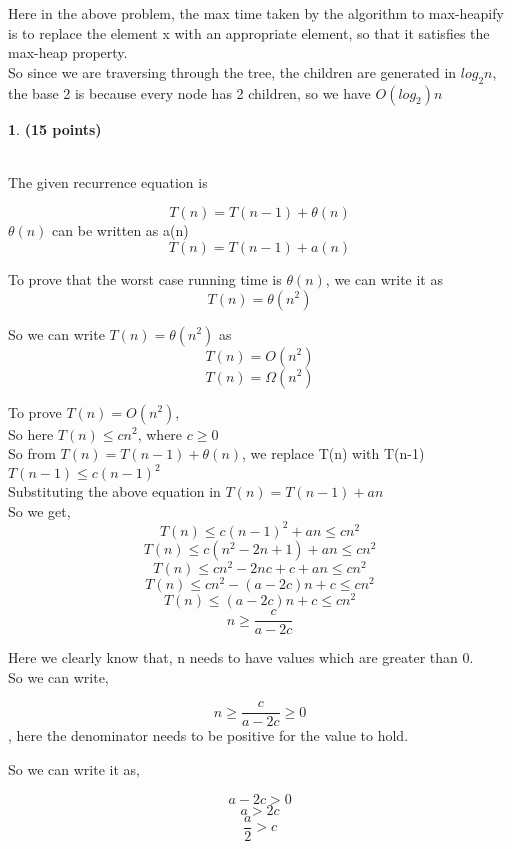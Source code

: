 \documentclass[11pt]{article}
\theoremstyle{definition}
\newtheorem{prob}{}
\newcommand{\solution}{\medskip\noindent{\color{DarkBlue}\textbf{Solution:}}}
\begin{document}
Here in the above problem, the max time taken by the algorithm to max-heapify is to replace the element x with an appropriate element, so that it satisfies the max-heap property. \\

So since we are traversing through the tree, the children are generated in $log_2 n$, the base 2 is because every node has 2 children, so we have $O(log_2) n$

\begin{prob} \textbf{(15 points)}
\end{prob}
\solution \\
The given recurrence equation is

\[ T(n) = T(n-1) + \theta(n)\]
$\theta(n)$ can be written as a(n)
\[ T(n) = T(n-1) + a(n)\]

To prove that the worst case running time is $\theta(n)$, we can write it as
\[ T(n) = \theta(n^2) \]

So we can write $T(n) = \theta(n^2)$ as
\[ T(n) = O(n^2) \]
\[ T(n) = \Omega(n^2) \]

To prove $T(n) = O(n^2)$, \\

So here $ T(n) \leq cn^2$, where $c \geq 0$ \\

So from $T(n) = T(n-1) + \theta(n)$, we replace T(n) with T(n-1) \\

$T(n-1) \leq c(n-1)^2$ \\

Substituting the above equation in $T(n) = T(n-1) + an$ \\

So we get, \\

\[ T(n) \leq c(n-1)^2 + an \leq cn^2 \]
\[ T(n) \leq c(n^2-2n+1) + an \leq cn^2 \]
\[ T(n) \leq cn^2-2nc+c + an \leq cn^2 \]
\[ T(n) \leq cn^2-(a-2c)n + c \leq cn^2 \]
\[ T(n) \leq (a-2c)n + c \leq cn^2 \]
\[ n \geq \frac{c}{a-2c} \]

Here we clearly know that, n needs to have values which are greater than 0. \\

So we can write,

\[ n \geq \frac{c}{a-2c} \geq 0 \], here the denominator needs to be positive for the value to hold.

So we can write it as,

\[ a-2c > 0\]
\[ a > 2c \]
\[ \frac{a}{2} >c \]
\end{document}
